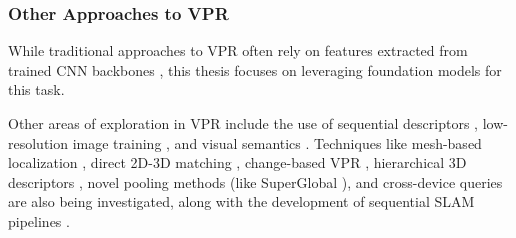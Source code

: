 \subsubsection{Other Approaches to VPR}

While traditional approaches to VPR often rely on features extracted
from trained CNN backbones \cite{Sarlin2018FromCT}, this thesis
focuses on leveraging foundation models for this task.  

Other areas of exploration in VPR include the use of sequential
descriptors \cite{Garg2021SeqNetLD, Garg2021SeqMatchNetCL,
Xu2018SequentialVV}, low-resolution image training
\cite{Khaliq2022MultiResNetVLADAP}, and visual semantics
\cite{Garg2018LoSTAP}. Techniques like mesh-based localization
\cite{Panek2022MeshLocMV}, direct 2D-3D matching
\cite{Sattler2011FastIL}, change-based VPR \cite{Garg2020DeltaDC},
hierarchical 3D descriptors \cite{Du2020DH3DDH}, novel pooling methods
(like SuperGlobal \cite{Shao2023GlobalFA}), and cross-device queries
\cite{Huang2023360LocAD} are also being investigated, along with the
development of sequential SLAM pipelines \cite{Milford2012SeqSLAMVR}.

